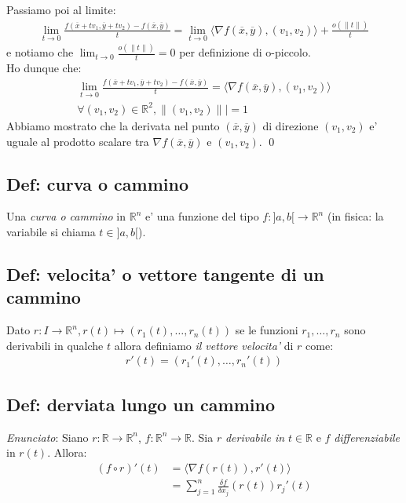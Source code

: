 \documentclass{article}
\begin{document}
Passiamo poi al limite:
\begin{align*}
  \lim_{t \to 0}\frac{f(\overline{x} + tv_1, \overline{y} + tv_2) - f(\overline{x}, \overline{y})}{t} =
  \lim_{t \to 0} \langle\nabla f(\overline{x}, \overline{y}), (v_1, v_2) \rangle + \frac{o(\|t\|)}{t}
\end{align*}
e notiamo che $\lim_{t \to 0} \frac{o(\|t\|)}{t} = 0$ per definizione di o-piccolo. \\
Ho dunque che:
\begin{align*}
  \lim_{t \to 0}\frac{f(\overline{x} + tv_1, \overline{y} + tv_2) - f(\overline{x}, \overline{y})}{t} =
  \langle\nabla f(\overline{x}, \overline{y}), (v_1, v_2) \rangle \\
  \forall (v_1, v_2) \in \mathbb{R}^2, \|(v_1, v_2)\|| = 1
\end{align*}
Abbiamo mostrato che la derivata nel punto $(\overline{x}, \overline{y})$ di
direzione $(v_1, v_2)$ e' uguale al prodotto scalare tra $\nabla f(\overline{x},
\overline{y})$ e $(v_1, v_2)$.
\qed

\subsection{Def: curva o cammino}

Una \emph{curva o cammino} in $\mathbb{R}^n$ e' una funzione del tipo $f: ]a,b[ \to
\mathbb{R}^n$ (in fisica: la variabile si chiama $t \in ]a,b[$).

\subsection{Def: velocita' o vettore tangente di un cammino}

Dato $r: I \to \mathbb{R}^n, r(t) \mapsto (r_1(t), \ldots, r_n(t))$ se le funzioni
$r_1, \ldots, r_n$ sono derivabili in qualche $t$ allora definiamo \emph{il vettore
velocita'} di $r$ come:
\begin{align*}
  r'(t) = (r_1'(t), \ldots, r_n'(t))
\end{align*}

\subsection{Def: derviata lungo un cammino}

\emph{Enunciato}: Siano $r: \mathbb{R} \to \mathbb{R}^n$, $f: \mathbb{R}^n \to \mathbb{R}$.
Sia $r$ \emph{derivabile in} $t \in \mathbb{R}$ e $f$ \emph{differenziabile} in $r(t)$.
Allora:
\begin{align*}
  (f \circ r)'(t) &= \langle \nabla f(r(t)), r'(t) \rangle \\
                  &= \sum_{j=1}^n \frac{\delta f}{\delta x_j} (r(t))r_j'(t)
\end{align*}
\end{document}

